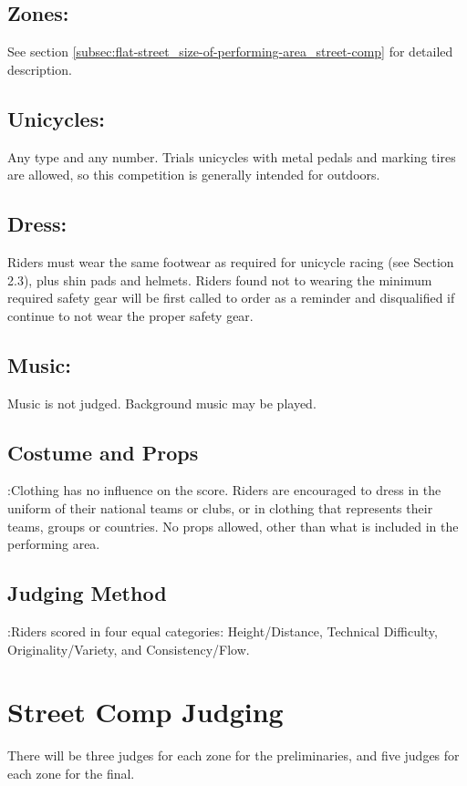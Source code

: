 \subsection{Zones:}
See section \ref{subsec:flat-street_size-of-performing-area_street-comp} for detailed description.

\subsection{Unicycles:}
Any type and any number.
Trials unicycles with metal pedals and marking tires are allowed, so this competition is generally intended for outdoors.

\subsection{Dress:}
Riders must wear the same footwear as required for unicycle racing (see Section 2.3), plus shin pads and helmets.
Riders found not to wearing the minimum required safety gear will be first called to order as a reminder and disqualified if continue to not wear the proper safety gear.

\subsection{Music:}
Music is not judged.
Background music may be played.

\subsection{Costume and Props}:Clothing has no influence on the score.
Riders are encouraged to dress in the uniform of their national teams or clubs, or in clothing that represents their teams, groups or countries.
No props allowed, other than what is included in the performing area.

\subsection{Judging Method}:Riders scored in four equal categories: Height/Distance, Technical Difficulty, Originality/Variety, and Consistency/Flow.

\section{Street Comp Judging}
There will be three judges for each zone for the preliminaries, and five judges for each zone for the final.

